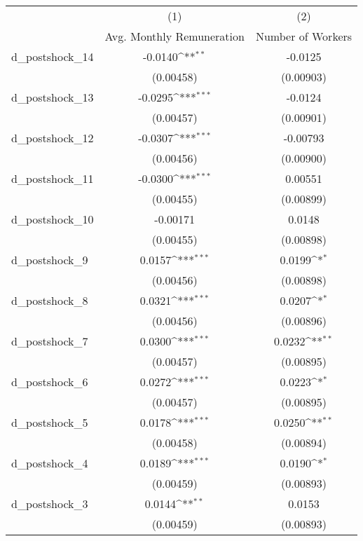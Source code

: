 {
\def\sym#1{\ifmmode^{#1}\else\(^{#1}\)\fi}
\begin{tabular}{l*{2}{c}}
\hline\hline
          &\multicolumn{1}{c}{(1)}&\multicolumn{1}{c}{(2)}\\
          &\multicolumn{1}{c}{Avg. Monthly Remuneration}&\multicolumn{1}{c}{Number of Workers}\\
\hline
d\_postshock\_14&  -0.0140\sym{**} &  -0.0125         \\
          &(0.00458)         &(0.00903)         \\
d\_postshock\_13&  -0.0295\sym{***}&  -0.0124         \\
          &(0.00457)         &(0.00901)         \\
d\_postshock\_12&  -0.0307\sym{***}& -0.00793         \\
          &(0.00456)         &(0.00900)         \\
d\_postshock\_11&  -0.0300\sym{***}&  0.00551         \\
          &(0.00455)         &(0.00899)         \\
d\_postshock\_10& -0.00171         &   0.0148         \\
          &(0.00455)         &(0.00898)         \\
d\_postshock\_9&   0.0157\sym{***}&   0.0199\sym{*}  \\
          &(0.00456)         &(0.00898)         \\
d\_postshock\_8&   0.0321\sym{***}&   0.0207\sym{*}  \\
          &(0.00456)         &(0.00896)         \\
d\_postshock\_7&   0.0300\sym{***}&   0.0232\sym{**} \\
          &(0.00457)         &(0.00895)         \\
d\_postshock\_6&   0.0272\sym{***}&   0.0223\sym{*}  \\
          &(0.00457)         &(0.00895)         \\
d\_postshock\_5&   0.0178\sym{***}&   0.0250\sym{**} \\
          &(0.00458)         &(0.00894)         \\
d\_postshock\_4&   0.0189\sym{***}&   0.0190\sym{*}  \\
          &(0.00459)         &(0.00893)         \\
d\_postshock\_3&   0.0144\sym{**} &   0.0153         \\
          &(0.00459)         &(0.00893)         \\

\end{tabular}}
